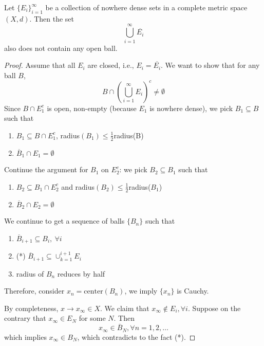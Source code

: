 \begin{theorem}
Let $\{E_i\}_{i=1}^\infty$ be a collection of nowhere dense sets in a complete metric space $(X,d)$. 
Then the set
\[
\bigcup_{i=1}^\infty \overline{E_i}
\]
also does not contain any open ball.
\end{theorem}
\begin{proof}
Assume that all $E_i$ are closed, i.e., $E_i=\overline{E_i}$. We want to show that for any ball $B$,
\[
B\cap\left(\bigcup_{i=1}^\infty E_i\right)^c\ne\emptyset
\]
Since $B\cap E_1^c$ is open, non-empty (because $E_1$ is nowhere dense), we pick $B_1\subseteq B$ such that 
\begin{enumerate}
\item
$B_1\subseteq B\cap E_1^c$, radius$(B_1)\le\frac{1}{2}$radius(B)
\item
$\overline{B}_1\cap E_1=\emptyset$
\end{enumerate}
Continue the argument for $B_1$ on $E_2^c$: we pick $B_2\subseteq B_1$ such that
\begin{enumerate}
\item
$B_2\subseteq B_1\cap E_2^c$ and radius$(B_2)\le\frac{1}{2}$radius($B_1$)
\item
$\overline{B}_2\cap E_2=\emptyset$
\end{enumerate}
We continue to get a sequence of balls $\{B_n\}$ such that
\begin{enumerate}
\item
$\overline{B}_{i+1}\subseteq B_i,\ \forall i$
\item(*)
$\overline{B}_{i+1}\subseteq\cup_{k=1}^{i+1}E_i$
\item
radius of $B_n$ reduces by half
\end{enumerate}
Therefore, consider $x_n=\text{center}(B_n)$, we imply $\{x_n\}$ is Cauchy. 

By completeness, $x\to x_\infty\in X$. We claim that $x_\infty\notin E_i,\forall i$. 
Suppose on the contrary that $x_\infty\in E_N$ for some $N$. Then
\[
x_\infty\in\overline{B}_N,\forall n=1,2,\dots
\]
which implies $x_\infty\in B_N$, which contradicts to the fact (*).
\end{proof}

































